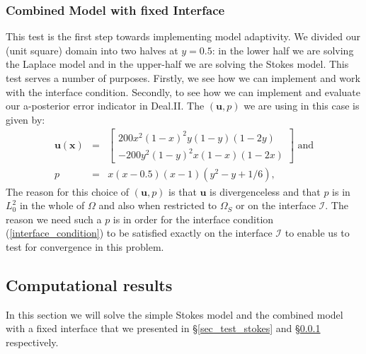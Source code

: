 \documentclass[12pt,a4paper]{article}
\theoremstyle{definition}
\begin{document}
\subsubsection{Combined Model with fixed Interface}\label{sec_test_combi_fixed}
This  test is the first step towards implementing model adaptivity.  We divided our (unit square) domain into two halves at $y=0.5$: in the lower half we are solving the Laplace model and in the upper-half we are solving the Stokes model.  This test serves a number of purposes.
Firstly, we see how we can implement and work with the interface condition.   Secondly, to see how we can implement and evaluate our a-posterior error indicator in Deal.II.  The $\left(\textbf{u},p\right)$ we are using in this case is given by:
\begin{eqnarray}
\label{benchmark_u_mm1}
\textbf{u}\left(\textbf{x}\right)&=&\begin{bmatrix}
200x^2\left(1-x\right)^2y\left(1-y\right)\left(1-2y\right)  \\
-200y^2\left(1-y\right)^2x\left(1-x\right)\left(1-2x\right)  
\end{bmatrix} \text{ and}\\\label{benchmark_p_mm1}
p &=& x\left(x-0.5\right)\left(x-1\right)\left(y^2-y+1/6\right),
\end{eqnarray}
The reason for this choice of $\left(\textbf{u},p\right)$ is that $\textbf{u}$ is divergenceless and that $p$ is in $L^2_0$ in the whole of $\Omega$ and also when restricted to $\Omega_S$ or on the interface $\mathcal{I}$.  The reason we need such a $p$ is in order for the interface condition (\ref{interface_condition}) to be satisfied exactly on the interface $\mathcal{I}$ to enable us to test for convergence in this problem.
\subsection{Computational results}\label{sec_dealii_results}
In this section we will solve the simple Stokes model and the combined model with a fixed interface that we presented in \S \ref{sec_test_stokes} and \S \ref{sec_test_combi_fixed} respectively. 
\end{document}
